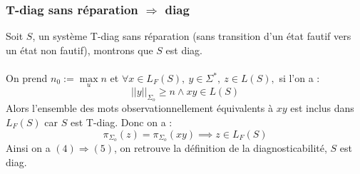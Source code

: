\documentclass[10pt,a4paper]{article}
\begin{document}
\subsubsection{T-diag sans r\'eparation $\Rightarrow$ diag}
Soit $S$, un système T-diag sans réparation (sans transition d'un état fautif vers un état non fautif), montrons que $S$ est diag.
\paragraph{}
\noindent On prend $n_0:= \max\limits_{u} n$ et
$\forall x \in L_F(S),\ y \in \Sigma^*,\ z \in L(S),$ si l'on a :
\begin{equation}
||y||_{\Sigma_o} \ge n \land xy \in  L(S) 
\end{equation}
Alors l'ensemble des mots observationnellement équivalents à $xy$ est inclus dans $L_F(S)$ car $S$ est T-diag. Donc on a :
\begin{equation}
 \pi_{\Sigma_o}(z)=\pi_{\Sigma_o}(xy) \implies z \in L_F(S)
\end{equation}
Ainsi on a $(4) \Rightarrow (5)$, on retrouve la définition de la diagnosticabilité, $S$ est diag.


\newpage
\end{document}
